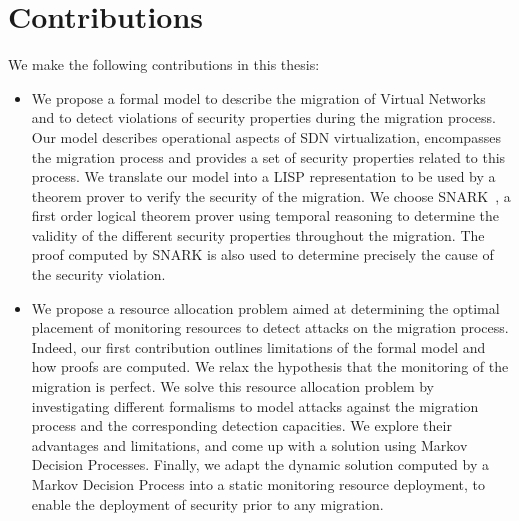 \section{Contributions}
We make the following contributions in this thesis:

\begin{itemize}
    \item We propose a formal model to describe the migration of Virtual Networks and to detect violations of security properties during the migration process.
    Our model describes operational aspects of SDN virtualization, encompasses the migration process and provides a set of security properties related to this process. We translate our model into a LISP representation to be used by a theorem prover to verify the security of the migration. We choose SNARK~\cite{snark-Stickel2000}, a first order logical theorem prover using temporal reasoning to determine the validity of the different security properties throughout the migration. The proof computed by SNARK is also used to determine precisely the cause of the security violation.
    
    \item  We propose a resource allocation problem aimed at determining the optimal placement of monitoring resources to detect attacks on the migration process. Indeed, our first contribution outlines limitations of the formal model and how proofs are computed. We relax the hypothesis that the monitoring of the migration is perfect. We solve this resource allocation problem by investigating different formalisms to model attacks against the migration process and the corresponding detection capacities. We explore their advantages and limitations, and come up with a solution using Markov Decision Processes. Finally, we adapt the dynamic solution computed by a Markov Decision Process into a static monitoring resource deployment, to enable the deployment of security prior to any migration.
\end{itemize}


